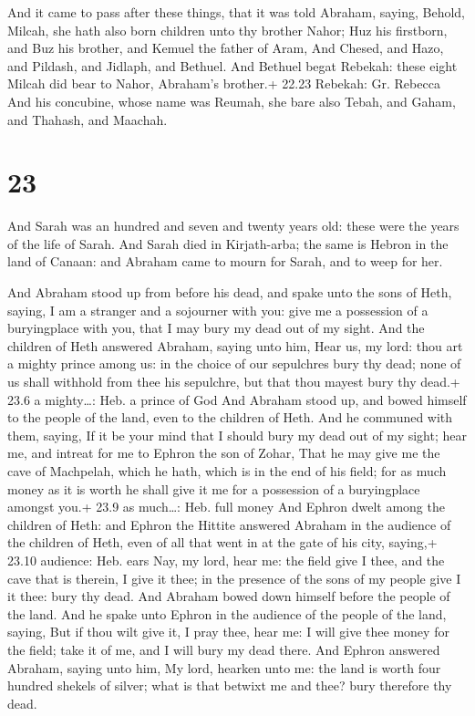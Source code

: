  And it came to pass after these things, that it was told
Abraham, saying, Behold, Milcah, she hath also born children unto thy
brother Nahor;  Huz his firstborn, and Buz his brother, and
Kemuel the father of Aram,  And Chesed, and Hazo, and
Pildash, and Jidlaph, and Bethuel.  And Bethuel begat
Rebekah: these eight Milcah did bear to Nahor, Abraham's brother.+ 22.23
Rebekah: Gr. Rebecca  And his concubine, whose name was
Reumah, she bare also Tebah, and Gaham, and Thahash, and Maachah.

\hypertarget{section-22}{%
\section{23}\label{section-22}}

 And Sarah was an hundred and seven and twenty years old:
these were the years of the life of Sarah.  And Sarah died
in Kirjath-arba; the same is Hebron in the land of Canaan: and Abraham
came to mourn for Sarah, and to weep for her.

 And Abraham stood up from before his dead, and spake unto
the sons of Heth, saying,  I am a stranger and a sojourner
with you: give me a possession of a buryingplace with you, that I may
bury my dead out of my sight.  And the children of Heth
answered Abraham, saying unto him,  Hear us, my lord: thou
art a mighty prince among us: in the choice of our sepulchres bury thy
dead; none of us shall withhold from thee his sepulchre, but that thou
mayest bury thy dead.+ 23.6 a mighty\ldots: Heb. a prince of God
 And Abraham stood up, and bowed himself to the people of
the land, even to the children of Heth.  And he communed
with them, saying, If it be your mind that I should bury my dead out of
my sight; hear me, and intreat for me to Ephron the son of Zohar,
 That he may give me the cave of Machpelah, which he hath,
which is in the end of his field; for as much money as it is worth he
shall give it me for a possession of a buryingplace amongst you.+ 23.9
as much\ldots: Heb. full money  And Ephron dwelt among the
children of Heth: and Ephron the Hittite answered Abraham in the
audience of the children of Heth, even of all that went in at the gate
of his city, saying,+ 23.10 audience: Heb. ears  Nay, my
lord, hear me: the field give I thee, and the cave that is therein, I
give it thee; in the presence of the sons of my people give I it thee:
bury thy dead.  And Abraham bowed down himself before the
people of the land.  And he spake unto Ephron in the
audience of the people of the land, saying, But if thou wilt give it, I
pray thee, hear me: I will give thee money for the field; take it of me,
and I will bury my dead there.  And Ephron answered
Abraham, saying unto him,  My lord, hearken unto me: the
land is worth four hundred shekels of silver; what is that betwixt me
and thee? bury therefore thy dead.

